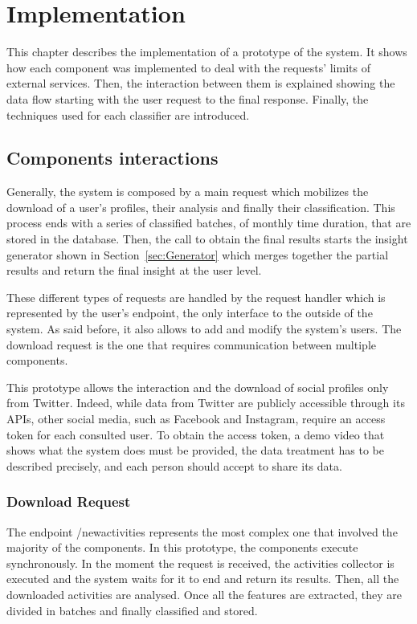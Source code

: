 \chapter{Implementation}
This chapter describes the implementation of a prototype of the system.
It shows how each component was implemented to deal with the requests' limits of external services.
Then, the interaction between them is explained showing the data flow starting with the user request to the final response.
Finally, the techniques used for each classifier are introduced.

\section{Components interactions}
Generally, the system is composed by a main request which mobilizes the download of a user's profiles, their analysis and finally their classification.
This process ends with a series of classified batches, of monthly time duration, that are stored in the database.
Then, the call to obtain the final results starts the insight generator shown in Section~\ref{sec:Generator} which merges together the partial results and return the final insight at the user level.

These different types of requests are handled by the request handler which is represented by the user's endpoint, the only interface to the outside of the system.
As said before, it also allows to add and modify the system's users.
The download request is the one that requires communication between multiple components.

This prototype allows the interaction and the download of social profiles only from Twitter.
Indeed, while data from Twitter are publicly accessible through its APIs, other social media, such as Facebook and Instagram, require an access token for each consulted user.
To obtain the access token, a demo video that shows what the system does must be provided, the data treatment has to be described precisely, and each person should accept to share its data.
\subsection{Download Request}
The endpoint /newactivities represents the most complex one that involved the majority of the components.
In this prototype, the components execute synchronously. In the moment the request is received, the activities collector is executed and the system waits for it to end and return its results.
Then, all the downloaded activities are analysed. Once all the features are extracted, they are divided in batches and finally classified and stored.

